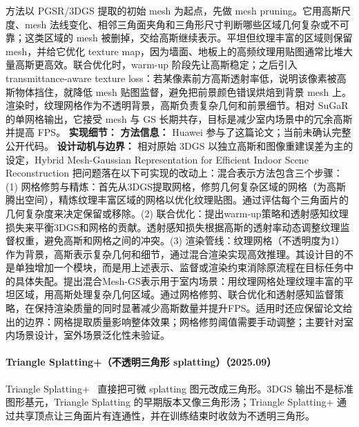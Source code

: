 方法以 PGSR/3DGS 提取的初始 mesh 为起点，先做 mesh pruning。它用高斯尺度、mesh 法线变化、相邻三角面夹角和三角形尺寸判断哪些区域几何复杂或不可靠；这类区域的 mesh 被删掉，交给高斯继续表示。平坦但纹理丰富的区域则保留 mesh，并给它优化 texture map，因为墙面、地板上的高频纹理用贴图通常比堆大量高斯更高效。联合优化时，warm-up 阶段先让高斯稳定；之后引入 transmittance-aware texture loss：若某像素前方高斯透射率低，说明该像素被高斯物体挡住，就降低 mesh 贴图监督，避免把前景颜色错误烘焙到背景 mesh 上。渲染时，纹理网格作为不透明背景，高斯负责复杂几何和前景细节。相对 SuGaR 的单网格输出，它接受 mesh 与 GS 长期共存，目标是减少室内场景中的冗余高斯并提高 FPS。
\textbf{实现细节：}
\textbf{方法信息：} Huawei 参与了这篇论文；当前未确认完整公开代码。
\textbf{设计动机与边界：} 相对原始 3DGS 以独立高斯和图像重建误差为主的设定，Hybrid Mesh-Gaussian Representation for Efficient Indoor Scene Reconstruction 把问题落在以下可实现的改动上：混合表示方法包含三个步骤：(1) 网格修剪与精炼：首先从3DGS提取网格，修剪几何复杂区域的网格（为高斯腾出空间），精炼纹理丰富区域的网格以优化纹理贴图。通过评估每个三角面片的几何复杂度来决定保留或移除。(2) 联合优化：提出warm-up策略和透射感知纹理损失来平衡3DGS和网格的贡献。透射感知损失根据高斯的透射率动态调整纹理监督权重，避免高斯和网格之间的冲突。(3) 渲染管线：纹理网格（不透明度为1）作为背景，高斯表示复杂几何和细节，通过混合渲染实现高效推理。其设计目的不是单独增加一个模块，而是用上述表示、监督或渲染约束消除原流程在目标任务中的具体失配。提出混合Mesh-GS表示用于室内场景：用纹理网格处理纹理丰富的平坦区域，用高斯处理复杂几何区域。通过网格修剪、联合优化和透射感知监督策略，在保持渲染质量的同时显著减少高斯数量并提升FPS。适用时还应保留论文给出的边界：网格提取质量影响整体效果；网格修剪阈值需要手动调整；主要针对室内场景设计，室外场景泛化性未验证。
\paragraph{Triangle Splatting+（不透明三角形 splatting）（2025.09）}
Triangle Splatting+~\cite{2509_25122} 直接把可微 splatting 图元改成三角形。3DGS 输出不是标准图形基元，Triangle Splatting 的早期版本又像三角形汤；Triangle Splatting+ 通过共享顶点让三角面片有连通性，并在训练结束时收敛为不透明三角形。

